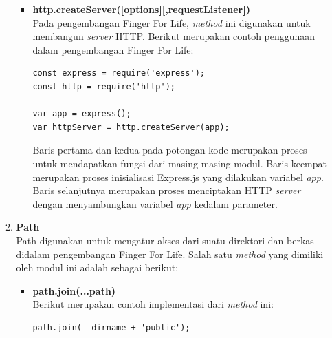 \begin{enumerate}
\begin{enumerate}
		\begin{itemize}
			\item \textbf{http.createServer([options][,requestListener])} \\
			Pada pengembangan Finger For Life, \textit{method} ini digunakan untuk membangun \textit{server} HTTP. Berikut merupakan contoh penggunaan dalam pengembangan Finger For Life:
\begin{lstlisting}
const express = require('express');
const http = require('http');

var app = express();
var httpServer = http.createServer(app);
\end{lstlisting}

Baris pertama dan kedua pada potongan kode merupakan proses untuk mendapatkan fungsi dari masing-masing modul. Baris keempat merupakan proses inisialisasi Express.js yang dilakukan variabel \textit{app}. Baris selanjutnya merupakan proses menciptakan HTTP \textit{server} dengan menyambungkan variabel \textit{app} kedalam parameter.			
		\end{itemize}
	
		\item \textbf{Path} \\
		Path digunakan untuk mengatur akses dari suatu direktori dan berkas didalam pengembangan Finger For Life. Salah satu \textit{method} yang dimiliki oleh modul ini adalah sebagai berikut:
		
		\begin{itemize}
			\item \textbf{path.join(...path)} \\
			Berikut merupakan contoh implementasi dari \textit{method} ini:
\begin{lstlisting}
path.join(__dirname + 'public');
\end{lstlisting} 
			

\end{itemize}
\end{enumerate}
\end{enumerate}
